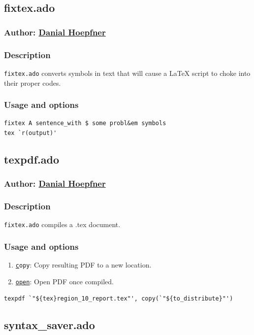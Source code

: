 {\subsection{fixtex.ado}
\subsubsection{Author: \href{mailto:dhoepfner@gibsonconsult.com}{Danial Hoepfner}}
\subsubsection{Description}
\texttt{fixtex.ado} converts symbols in text that will cause a \LaTeX{} script to choke into their proper codes.
\subsubsection{Usage and options}
\begin{lstlisting}
fixtex A sentence_with $ some probl&em symbols
tex `r(output)'
\end{lstlisting}


\subsection{texpdf.ado}
\subsubsection{Author: \href{mailto:dhoepfner@gibsonconsult.com}{Danial Hoepfner}}
\subsubsection{Description}
\texttt{fixtex.ado} compiles a .tex document.
\subsubsection{Usage and options}
\begin{enumerate}
\item \texttt{\underline{c}opy}: Copy resulting PDF to a new location.
\item \texttt{\underline{open}}: Open PDF once compiled.
\end{enumerate}

\begin{lstlisting}
texpdf `"${tex}region_10_report.tex"', copy(`"${to_distribute}"')
\end{lstlisting}

\subsection{syntax\_saver.ado}
}
